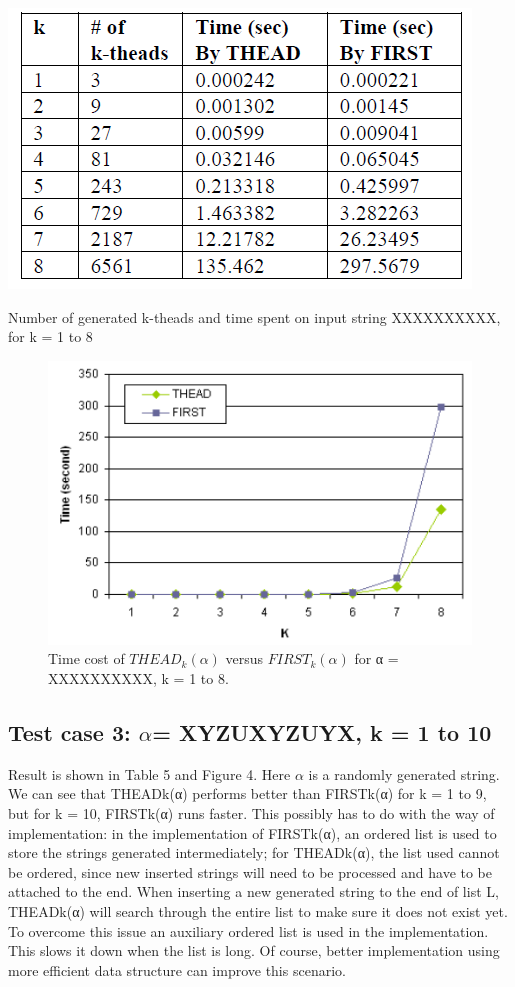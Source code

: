 \documentclass{sig-alternate-05-2015}
\begin{document}
\begin{table}
\centering
\includegraphics[scale=0.5]{table4.PNG}
\caption{Number of generated k-theads and time spent on
input string XXXXXXXXXX, for k = 1 to 8}
\label{table:4}
\end{table}

\begin{figure}
\centering
\includegraphics[scale=0.5]{figure3.PNG}
\caption{Time cost of $THEAD_k(\alpha)$ versus $FIRST_k(\alpha)$
for α = XXXXXXXXXX, k = 1 to 8.}
\label{fig:3}
\end{figure}

\subsection{Test case 3: $\alpha$= XYZUXYZUYX, k = 1 to 10}
Result is shown in Table 5 and Figure 4. Here $\alpha$ is a randomly
generated string. We can see that THEADk(α) performs
better than FIRSTk(α) for k = 1 to 9, but for k = 10,
FIRSTk(α) runs faster. This possibly has to do with the way
of implementation: in the implementation of FIRSTk(α), an
ordered list is used to store the strings generated intermediately;
for THEADk(α), the list used cannot be ordered,
since new inserted strings will need to be processed and
have to be attached to the end. When inserting a new generated
string to the end of list L, THEADk(α) will search
through the entire list to make sure it does not exist yet. To
overcome this issue an auxiliary ordered list is used in the
implementation. This slows it down when the list is long.
Of course, better implementation using more efficient data
structure can improve this scenario.
\end{document}
